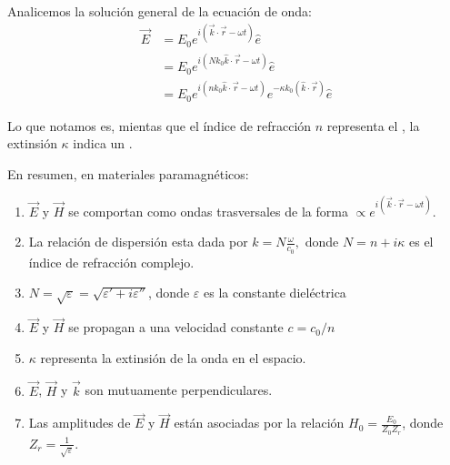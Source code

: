 \documentclass[letterpaper,10pt,english]{jupyterBook}
\let\sphinxpxdimen\pdfpxdimen\else\newdimen\sphinxpxdimen
\begin{document}
\sphinxAtStartPar
{}

\sphinxAtStartPar
Analicemos la solución general de la ecuación de onda:
\begin{align*}
\vec{E} &= E_0 e^{i\left(\vec{k}\cdot\vec{r} - \omega t\right)} \hat{e} \\
&= E_0 e^{i\left(Nk_0\hat{k}\cdot\vec{r} - \omega t\right)} \hat{e} \\
&= E_0 e^{i\left(nk_0\hat{k}\cdot\vec{r} - \omega t\right)}e^{-\kappa k_0\left(\hat{k}\cdot\vec{r}\right)} \hat{e}
\end{align*}
\noindent{\hspace*{\fill}\sphinxincludegraphics[width=300\sphinxpxdimen]{{decaying_wave}.png}\hspace*{\fill}}

\sphinxAtStartPar
Lo que notamos es, mientas que el índice de refracción \(n\) representa el , la extinsión \(\kappa\) indica un .

\sphinxAtStartPar
En resumen, en materiales paramagnéticos:
\begin{enumerate}
%
\item {} 
\sphinxAtStartPar
\(\vec{E}\) y \(\vec{H}\) se comportan como ondas trasversales de la forma \(\propto e^{ i\left(\vec{k}\cdot\vec{r} - \omega t\right)}\).

\item {} 
\sphinxAtStartPar
La relación de dispersión esta dada por \(k = N\frac{\omega}{c_0},\)
donde \(N = n + i\kappa\) es el índice de refracción complejo.

\item {} 
\sphinxAtStartPar
\(N =\sqrt{\varepsilon} =\sqrt{\varepsilon'+i\varepsilon''}\), donde \(\varepsilon\) es la constante dieléctrica

\item {} 
\sphinxAtStartPar
\(\vec{E}\) y \(\vec{H}\) se propagan a una velocidad constante \(c = c_0/n\)

\item {} 
\sphinxAtStartPar
\(\kappa\) representa la extinsión de la onda en el espacio.

\item {} 
\sphinxAtStartPar
\(\vec{E}\), \(\vec{H}\) y \(\vec{k}\) son mutuamente perpendiculares.

\item {} 
\sphinxAtStartPar
Las amplitudes de \(\vec{E}\) y \(\vec{H}\) están asociadas por la relación \({H}_0 = \frac{E_0}{Z_0Z_r}\), donde \(Z_r = \frac{1}{\sqrt{\varepsilon}}\).

\end{enumerate}
\end{document}
